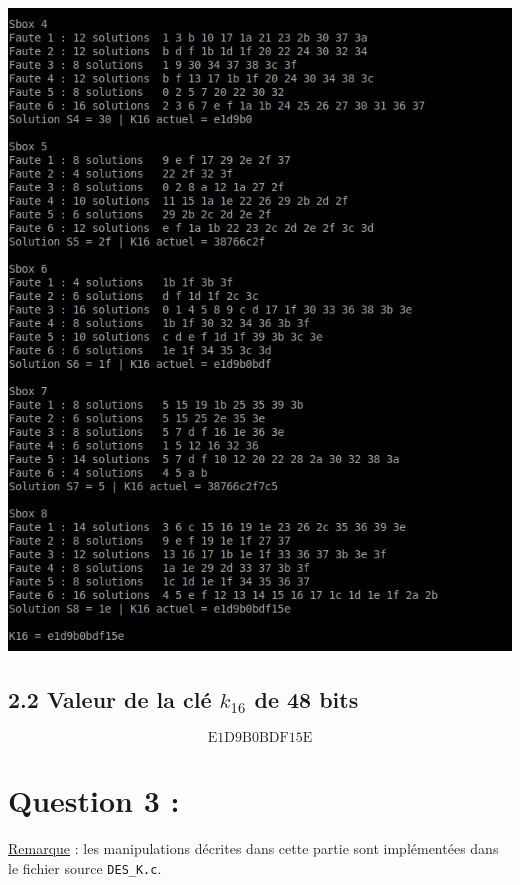 			\begin{center}\includegraphics[scale=0.8]{K16.png}\end{center}
			
		\subsection*{2.2 Valeur de la clé $k_{16}$ de 48 bits}
		\[ \textrm{E1D9B0BDF15E} \]
		
	\section*{Question 3 :}
		
		\noindent \underline{Remarque} : les manipulations décrites dans cette partie sont implémentées dans le fichier source \lstinline!DES_K.c!.
		
